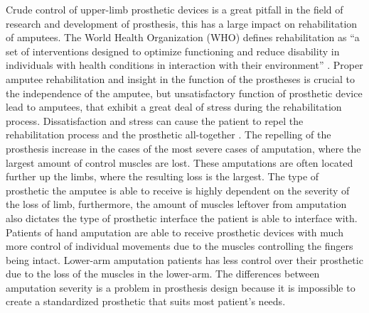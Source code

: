 \documentclass[../main.tex]{subfiles}
\begin{document}
Crude control of upper-limb prosthetic devices is a great pitfall in the field of research and development of prosthesis, this has a large impact on rehabilitation of amputees.
The World Health Organization (WHO) defines rehabilitation as ``a set of interventions designed to optimize functioning and reduce disability in individuals with health conditions in interaction with their environment'' \cite{WHO_rehab}.
Proper amputee rehabilitation and insight in the function of the prostheses is crucial to the independence of the amputee, but unsatisfactory function of prosthetic device lead to amputees, that exhibit a great deal of stress during the rehabilitation process.
Dissatisfaction and stress can cause the patient to repel the rehabilitation process and the prosthetic all-together \cite{Kristin2012}.
The repelling of the prosthesis increase in the cases of the most severe cases of amputation, where the largest amount of control muscles are lost.
These amputations are often located further up the limbs, where the resulting loss is the largest.
The type of prosthetic the amputee is able to receive is highly dependent on the severity of the loss of limb, furthermore, the amount of muscles leftover from amputation also dictates the type of prosthetic interface the patient is able to interface with.
Patients of hand amputation are able to receive prosthetic devices with much more control of individual movements due to the muscles controlling the fingers being intact. 
Lower-arm amputation patients has less control over their prosthetic due to the loss of the muscles in the lower-arm.
The differences between amputation severity is a problem in prosthesis design because it is impossible to create a standardized prosthetic that suits most patient's needs.


\end{document}
